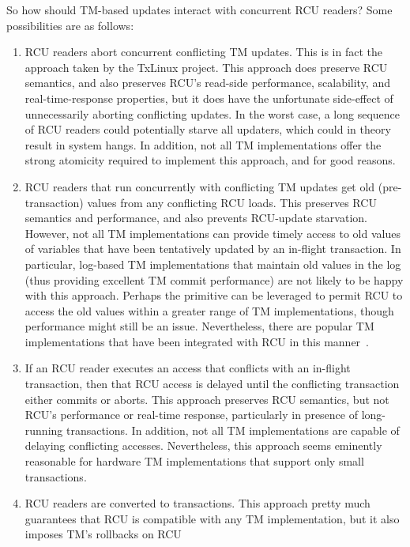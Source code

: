 So how should TM-based updates interact with concurrent RCU readers?
Some possibilities are as follows:

\begin{enumerate}
\item	RCU readers abort concurrent conflicting TM updates.
	This is in fact the approach taken by the TxLinux project.
	This approach does preserve RCU semantics, and also preserves
	RCU's read-side performance, scalability, and real-time-response
	properties, but it does have the unfortunate side-effect of
	unnecessarily aborting conflicting updates.
	In the worst case, a long sequence of RCU readers could
	potentially starve all updaters, which could in theory result
	in system hangs.
	In addition, not all TM implementations offer the strong atomicity
	required to implement this approach, and for good reasons.
\item	RCU readers that run concurrently with conflicting TM updates
	get old (pre-transaction) values from any conflicting RCU loads.
	This preserves RCU semantics and performance, and also prevents
	RCU-update starvation.
	However, not all TM implementations can provide timely access
	to old values of variables that have been tentatively updated
	by an in-flight transaction.
	In particular, log-based TM implementations that maintain
	old values in the log (thus providing excellent TM commit
	performance) are not likely to be happy with this approach.
	Perhaps the  primitive can be leveraged
	to permit RCU to access the old values within a greater range
	of TM implementations, though performance might still be an issue.
	Nevertheless, there are popular TM implementations that have
	been integrated with RCU in this
	manner~\cite{DonaldEPorter2007TRANSACT,PhilHoward2011RCUTMRBTree,
	PhilipWHoward2013RCUrbtree}.
\item	If an RCU reader executes an access that conflicts with an
	in-flight transaction, then that RCU access is delayed until
	the conflicting transaction either commits or aborts.
	This approach preserves RCU semantics, but not RCU's performance
	or real-time response, particularly in presence of long-running
	transactions.
	In addition, not all TM implementations are capable of delaying
	conflicting accesses.
	Nevertheless, this approach seems eminently reasonable for hardware
	TM implementations that support only small transactions.
\item	RCU readers are converted to transactions.
	This approach pretty much guarantees that RCU is compatible with
	any TM implementation, but it also imposes TM's rollbacks on RCU

\end{enumerate}
